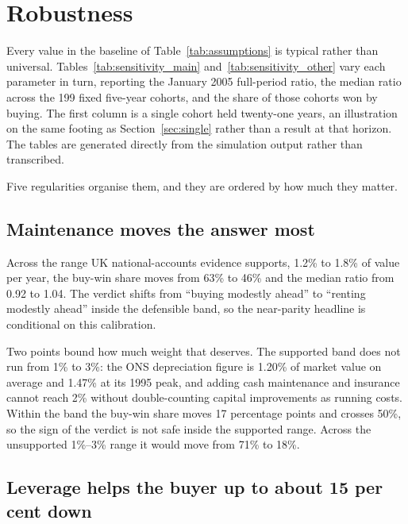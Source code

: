 
\section{Robustness}
\label{sec:robustness}

Every value in the baseline of Table~\ref{tab:assumptions} is typical rather than universal. Tables~\ref{tab:sensitivity_main} and~\ref{tab:sensitivity_other} vary each parameter in turn, reporting the January 2005 full-period ratio, the median ratio across the 199 fixed five-year cohorts, and the share of those cohorts won by buying. The first column is a single cohort held twenty-one years, an illustration on the same footing as Section~\ref{sec:single} rather than a result at that horizon. The tables are generated directly from the simulation output rather than transcribed.



Five regularities organise them, and they are ordered by how much they matter.

\subsection{Maintenance moves the answer most}

Across the range UK national-accounts evidence supports, 1.2\% to 1.8\% of value per year, the buy-win share moves from 63\% to 46\% and the median ratio from 0.92 to 1.04. The verdict shifts from ``buying modestly ahead'' to ``renting modestly ahead'' inside the defensible band, so the near-parity headline is conditional on this calibration.

Two points bound how much weight that deserves. The supported band does not run from 1\% to 3\%: the ONS depreciation figure is 1.20\% of market value on average and 1.47\% at its 1995 peak, and adding cash maintenance and insurance cannot reach 2\% without double-counting capital improvements as running costs. Within the band the buy-win share moves 17 percentage points and crosses 50\%, so the sign of the verdict is not safe inside the supported range. Across the unsupported 1\%--3\% range it would move from 71\% to 18\%.

\subsection{Leverage helps the buyer up to about 15 per cent down}


